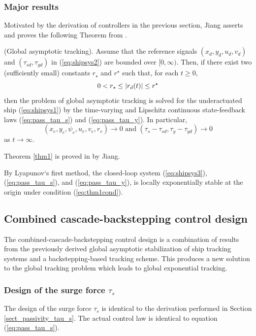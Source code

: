 \documentclass[amsthm, twocolumn]{autart}
\begin{document}
{\subsubsection{Major results}
Motivated by the derivation of controllers in the previous section, Jiang asserts and proves the following Theorem from \cite{Jiang02}.
%
%
\begin{theorem}
(Global asymptotic tracking). Assume that the reference signals $(x_d, y_d, u_d, v_d)$ and $(\tau_{sd},\tau_{yd})$ in (\ref{eq:shipsys2}) are bounded over $[0,\infty)$. Then, if there exist two (sufficiently small) constants $r_\star$ and $r^\star$ such that, for each $t \ge 0$,
%
\begin{equation}
0 < r_\star \le |r_d(t)| \le r^\star \\
\label{eq:thm1cond}
\end{equation}
%
then the problem of global asymptotic tracking is solved for the underactuated ship (\ref{eq:shipsys1}) by the time-varying and Lipschitz continuous state-feedback laws (\ref{eq:pass_tau_s}) and (\ref{eq:pass_tau_y}). In particular, 
%
\[(x_e,y_e,\psi_e,u_e,v_e,r_e)\rightarrow 0 \text{ and }(\tau_s-\tau_{sd},\tau_y-\tau_{yd})\rightarrow 0\]
%
as $t \rightarrow \infty$.
\label{thm1}
\end{theorem}
%
%
Theorem \ref{thm1} is proved in \cite{Jiang02} by Jiang.
%
%
\begin{remark}
By Lyapunov`s first method, the closed-loop system (\ref{eq:shipsys3}), (\ref{eq:pass_tau_s}), and (\ref{eq:pass_tau_y}), is locally exponentially stable at the origin under condition (\ref{eq:thm1cond}).
\end{remark}
%
%
%
%
\subsection{Combined cascade-backstepping control design}
The combined-cascade-backstepping control design is a combination of results from the previously derived global asymptotic stabilization of ship tracking systems and a backstepping-based tracking scheme. This produces a new solution to the global tracking problem which leads to global exponential tracking.
%
\subsubsection{Design of the surge force $\tau_s$}
The design of the surge force $\tau_s$ is identical to the derivation performed in Section \ref{sect_passivity_tau_s}. The actual control law is identical to equation (\ref{eq:pass_tau_s}).
%
}
\end{document}
